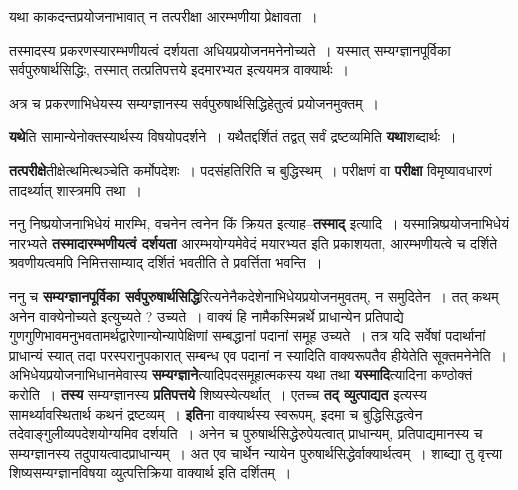 \documentclass[article,12pt,a4paper]{memoir}
\begin{document}
	  \pstart यथा काकदन्तप्रयोजनाभावात् न तत्परीक्षा आरम्भणीया प्रेक्षावता ।
	\pend
        

	  \pstart तस्मादस्य प्रकरणस्यारम्भणीयत्वं दर्शयता अधियप्रयोजनमनेनोच्यते । यस्मात् सम्यग्ज्ञानपूर्विका सर्वपुरुषार्थसिद्धिः, तस्मात् तत्प्रतिपत्तये इदमारभ्यत इत्ययमत्र वाक्यार्थः ।
	\pend
        

	  \pstart {}अत्र च प्रकरणाभिधेयस्य सम्यग्ज्ञानस्य सर्वपुरुषार्थसिद्धिहेतुत्वं प्रयोजनमुक्तम् ।
	\pend
      
	  \endgroup
	

	  \pstart \textbf{यथे}ति सामान्येनोक्तस्यार्थस्य विषयोपदर्शने । यथैतद्दर्शितं तद्वत् सर्वं द्रष्टव्यमिति \textbf{यथा}शब्दार्थः ।
	\pend
      

	  \pstart \textbf{तत्परीक्षे}तीक्षेत्थमित्थञ्चेति कर्मोपदेशः । पदसंहतिरिति च बुद्धिस्थम् । परीक्षणं वा \textbf{परीक्षा} विमृष्यावधारणं तादर्थ्यात् शास्त्रमपि तथा ।
	\pend
      

	  \pstart ननु निष्प्रयोजनाभिधेयं मारम्भि, वचनेन त्वनेन किं क्रियत इत्याह--\textbf{तस्माद्} इत्यादि । यस्मान्निष्प्रयोजनाभिधेयं नारभ्यते \textbf{तस्मादारम्भणीयत्वं दर्शयता} आरम्भयोग्यमेवेदं मयारभ्यत इति प्रकाशयता, आरम्भणीयत्वे च दर्शिते श्रवणीयत्वमपि निमित्तसाम्याद् दर्शितं भवतीति ते प्रवर्त्तिता भवन्ति ।
	\pend
      

	  \pstart ननु च \textbf{सम्यग्ज्ञानपूर्विका सर्वपुरुषार्थसिद्धि}रित्यनेनैकदेशेनाभिधेयप्रयोजनमुवतम्, न समुदितेन । तत् कथम् अनेन वाक्येनोच्यते इत्युच्यते ? उच्यते । वाक्यं हि नामैकस्मिन्नर्थे प्राधान्येन प्रतिपाद्ये गुणगुणिभावमनुभवतामर्थद्वारेणान्योन्यापेक्षिणां सम्बद्धानां पदानां समूह उच्यते । तत्र यदि सर्वेषां पदार्थानां प्राधान्यं स्यात् तदा परस्परानुपकारात् सम्बन्ध एव पदानां न स्यादिति वाक्यरूपतैव हीयेतेति सूक्तमनेनेति । अभिधेयप्रयोजनाभिधानमेवास्य \textbf{सम्यग्ज्ञाने}त्यादिपदसमूहात्मकस्य यथा तथा \textbf{यस्मादि}त्यादिना कण्ठोक्तं करोति । \textbf{तस्य} सम्यग्ज्ञानस्य \textbf{प्रतिपत्तये} शिष्यस्येत्यर्थात् । एतच्च \textbf{तद् व्युत्पाद्यत} इत्यस्य सामर्थ्यावस्थितार्थ कथनं द्रष्टव्यम् । \textbf{इति}ना वाक्यार्थस्य स्वरूपम्, इदमा च बुद्धिसिद्धत्वेन तदेवाङ्गुलीव्यपदेशयोग्यमिव दर्शयति । अनेन च पुरुषार्थसिद्धेरुपेयत्वात् प्राधान्यम्, प्रतिपाद्यमानस्य च सम्यग्ज्ञानस्य तदुपायत्वादप्राधान्यम् । अत एव चार्थेन न्यायेन पुरुषार्थसिद्धेर्वाक्यार्थत्वम् । शाब्द्या तु वृत्त्या शिष्यसम्यग्ज्ञानविषया व्युत्पत्तिक्रिया वाक्यार्थ इति दर्शितम् ।
	\pend
      
\end{document}
